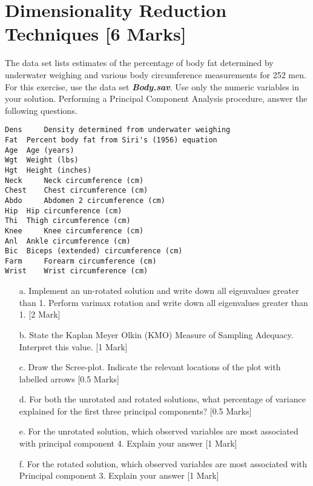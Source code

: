 \documentclass[12pt, a4paper]{article}
\theoremstyle{plain}
\theoremstyle{definition}
\theoremstyle{remark}
\begin{document}
\newpage
\section{Dimensionality Reduction Techniques [6 Marks]}  %
The data set lists estimates of the percentage of body fat determined by underwater
weighing and various body circumference measurements for 252 men.
For this exercise, use the data set \textbf{\textit{Body.sav}}. Use only the numeric variables in your solution.
Performing a Principal Component Analysis procedure, answer the following questions.
\begin{verbatim}
Dens	 Density determined from underwater weighing
Fat	 Percent body fat from Siri's (1956) equation
Age	 Age (years)
Wgt	 Weight (lbs)
Hgt	 Height (inches)
Neck	 Neck circumference (cm)
Chest	 Chest circumference (cm)
Abdo	 Abdomen 2 circumference (cm)
Hip	 Hip circumference (cm)
Thi	 Thigh circumference (cm)
Knee	 Knee circumference (cm)
Anl	 Ankle circumference (cm)
Bic	 Biceps (extended) circumference (cm)
Farm	 Forearm circumference (cm)
Wrist	 Wrist circumference (cm)

\end{verbatim}






\begin{itemize}
\item[a.] Implement an un-rotated solution and write down all eigenvalues greater than 1. Perform varimax rotation and write down all eigenvalues greater than 1. [2 Mark]
\item[b.] State the Kaplan Meyer Olkin (KMO) Measure of Sampling Adequacy. Interpret this value. [1 Mark]
\item[c.] Draw the Scree-plot. Indicate the relevant locations of the plot with labelled arrows [0.5 Marks]
\item[d.] For both the unrotated and rotated solutions, what percentage of variance explained for the first three principal components? [0.5 Marks] %
\item[e.] For the unrotated solution, which observed variables are most associated with principal component 4.  Explain your answer [1 Mark]
\item[f.] For the rotated solution, which observed variables are most associated with Principal component 3.  Explain your answer [1 Mark]
\end{itemize}
\end{document}
